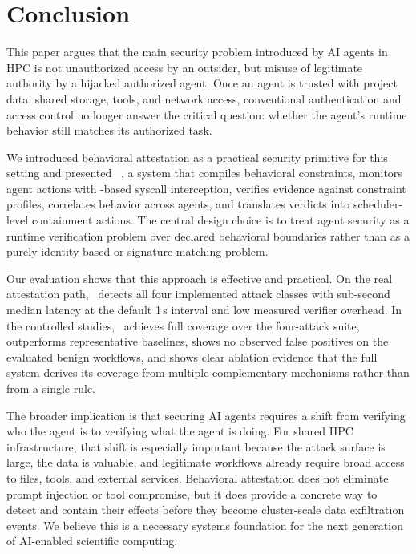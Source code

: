 \section{Conclusion}

This paper argues that the main security problem introduced by AI agents in HPC
is not unauthorized access by an outsider, but misuse of legitimate authority by
a hijacked authorized agent. Once an agent is trusted with project data, shared
storage, tools, and network access, conventional authentication and access
control no longer answer the critical question: whether the agent's runtime
behavior still matches its authorized task.

We introduced behavioral attestation as a practical security primitive for this
setting and presented \projectname~, a system that compiles behavioral constraints,
monitors agent actions with \ebpf-based syscall interception, verifies evidence
against constraint profiles, correlates behavior across agents, and translates
verdicts into scheduler-level containment actions. The central design choice is
to treat agent security as a runtime verification problem over declared
behavioral boundaries rather than as a purely identity-based or
signature-matching problem.

Our evaluation shows that this approach is effective and practical. On the real
attestation path, \projectname~detects all four implemented attack classes with
sub-second median latency at the default 1\,s interval and low measured verifier
overhead. In the controlled studies, \projectname~achieves full coverage over the
four-attack suite, outperforms representative baselines, shows no observed false positives on the evaluated benign workflows, and shows clear
ablation evidence that the full system derives its coverage from multiple
complementary mechanisms rather than from a single rule.

The broader implication is that securing AI agents requires a shift from
verifying who the agent is to verifying what the agent is doing. For shared HPC
infrastructure, that shift is especially important because the attack surface is
large, the data is valuable, and legitimate workflows already require broad
access to files, tools, and external services. Behavioral attestation does not
eliminate prompt injection or tool compromise, but it does provide a concrete
way to detect and contain their effects before they become cluster-scale data
exfiltration events. We believe this is a necessary systems foundation for the
next generation of AI-enabled scientific computing.
